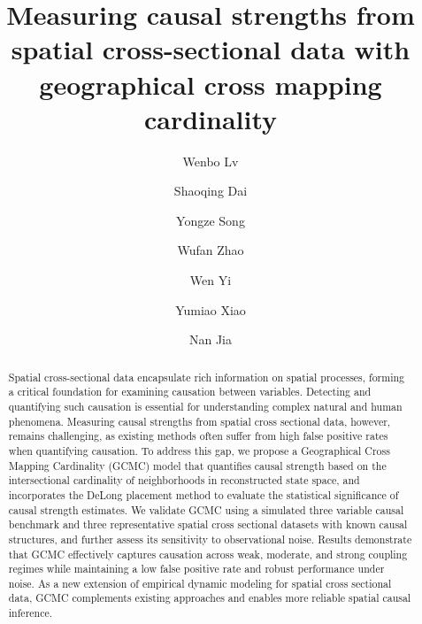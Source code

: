 \documentclass[authoryear,preprint,review,12pt]{elsarticle}
\begin{document}
\begin{frontmatter}
\title{Measuring causal strengths from spatial cross-sectional data with geographical cross mapping cardinality}

\author[a,b,c]{Wenbo Lv}

\author[d]{Shaoqing Dai}

\author[e]{Yongze Song}

\author[a]{Wufan Zhao}

\author[b]{Wen Yi}

\author[a]{Yumiao Xiao}

\author[f,g]{Nan Jia}


\address[a]{Urban Governance and Design Thrust, The Hong Kong University of Science and Technology (Guangzhou), Guangzhou, China}
\address[b]{Department of Building and Real Estate, The Hong Kong Polytechnic University, Hong Kong, China}
\address[c]{The Hong Kong Polytechnic University, Shenzhen Research Institute, Shenzhen, China}
\address[d]{School of Resource and Environmental Sciences, Wuhan University, Wuhan, China}
\address[e]{School of Design and the Built Environment, Curtin University, Perth, Australia}
\address[f]{College of Public Administration, Nanjing Agricultural University, Nanjing, China}
\address[g]{Department of Fisheries and Wildlife, Michigan State University, East Lansing, United States}

\begin{abstract}

Spatial cross-sectional data encapsulate rich information on spatial processes, forming a critical foundation for examining causation between variables. Detecting and quantifying such causation is essential for understanding complex natural and human phenomena. Measuring causal strengths from spatial cross sectional data, however, remains challenging, as existing methods often suffer from high false positive rates when quantifying causation. To address this gap, we propose a Geographical Cross Mapping Cardinality (GCMC) model that quantifies causal strength based on the intersectional cardinality of neighborhoods in reconstructed state space, and incorporates the DeLong placement method to evaluate the statistical significance of causal strength estimates. We validate GCMC using a simulated three variable causal benchmark and three representative spatial cross sectional datasets with known causal structures, and further assess its sensitivity to observational noise. Results demonstrate that GCMC effectively captures causation across weak, moderate, and strong coupling regimes while maintaining a low false positive rate and robust performance under noise. As a new extension of empirical dynamic modeling for spatial cross sectional data, GCMC complements existing approaches and enables more reliable spatial causal inference.


\end{abstract}
\end{frontmatter}
\end{document}
